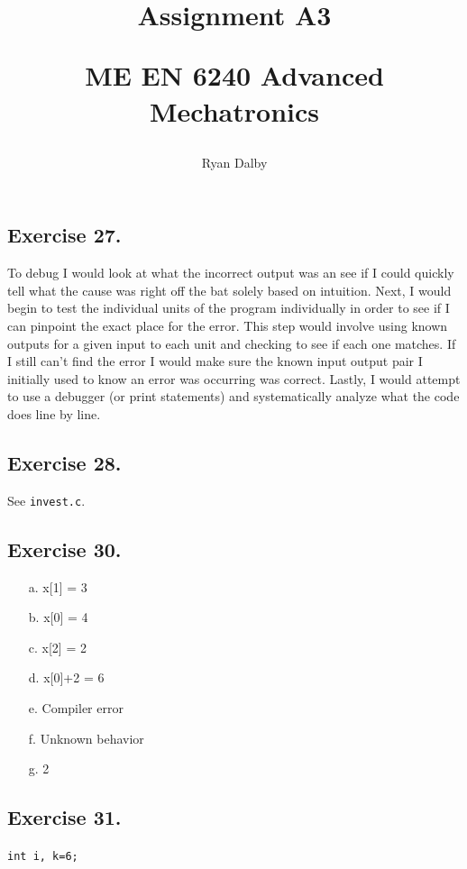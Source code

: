 \documentclass[12pt]{article}
\title{
    Assignment A3

    \large{
        ME EN 6240 Advanced Mechatronics
    }  
}
\author{
        Ryan Dalby
}
\date{\displaydate{date}}
\begin{document}
\maketitle

\subsection*{Exercise 27.}
To debug I would look at what the incorrect output was an see if I could quickly tell what the cause was right off the bat solely based on intuition.
Next, I would begin to test the individual units of the program individually in order to see if I can pinpoint the exact place for the error.
This step would involve using known outputs for a given input to each unit and checking to see if each one matches.
If I still can't find the error I would make sure the known input output pair I initially used to know an error was occurring was correct.
Lastly, I would attempt to use a debugger (or print statements) and systematically analyze what the code does line by line.

\subsection*{Exercise 28.}
See \verb|invest.c|.

\subsection*{Exercise 30.}
\begin{itemize}
    \item[a.]
    x[1] = 3

    \item[b.]
    x[0] = 4

    \item[c.]  
    x[2] = 2

    \item[d.]
    x[0]+2 = 6

    \item[e.]
    Compiler error

    \item[f.]
    Unknown behavior

    \item[g.]
    2

\end{itemize}

\subsection*{Exercise 31.}
\noindent
\verb|int i, k=6;|
\end{document}
